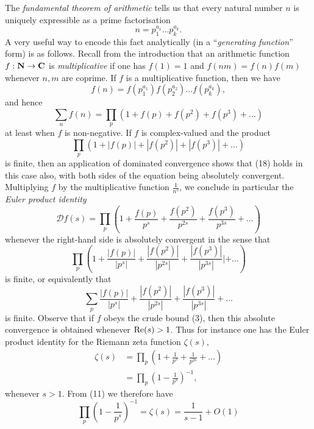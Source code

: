 \documentclass[10pt,reqno]{amsart}
\begin{document}
The \emph{fundamental theorem of arithmetic} tells us that every natural number $n$ is uniquely expressible as a prime factorisation
%
\begin{equation}   n = p_1^{a_1} \dots p_k^{a_k}. \end{equation}
%
A very useful way to encode this fact analytically (in a “\emph{generating function}” form) is as follows. Recall from the introduction that an arithmetic function $f: {\bf N} \rightarrow {\bf C}$ is \emph{multiplicative} if one has $f(1)=1$ and $f(nm) = f(n) f(m)$ whenever $n,m$ are coprime. If $f$ is a multiplicative function, then we have
%
\[  f(n) = f(p_1^{a_1}) f(p_2^{a_2}) \dots f(p_k^{a_k}),\]
%
and hence
%
\begin{equation}   \sum_n f(n) = \prod_p (1 + f(p) + f(p^2) + f(p^3) + \dots ) \end{equation}
%
at least when $f$ is non-negative. If $f$ is complex-valued and the product
%
\[  \prod_p (1 + |f(p)| + |f(p^2)| + |f(p^3)| + \dots )\]
%
is finite, then an application of dominated convergence shows that (18) holds in this case also, with both sides of the equation being absolutely convergent. Multiplying $f$ by the multiplicative function $\frac{1}{n^s}$, we conclude in particular the \emph{Euler product identity}
%
\begin{equation}   {\mathcal D} f(s) = \prod_p \left(1 + \frac{f(p)}{p^s} + \frac{f(p^2)}{p^{2s}} + \frac{f(p^3)}{p^{3s}} + \dots \right) \end{equation}
%
whenever the right-hand side is absolutely convergent in the sense that
%
\[  \prod_p \left(1 + \frac{|f(p)|}{|p^s|} + \frac{|f(p^2)|}{|p^{2s}|} + \frac{|f(p^3)|}{|p^{3s}|}|+ \dots \right)\]
%
is finite, or equivalently that
%
\[  \sum_p \frac{|f(p)|}{|p^s|} + \frac{|f(p^2)|}{|p^{2s}|} + \frac{|f(p^3)|}{|p^{3s}|} + \dots \]
%
is finite. Observe that if $f$ obeys the crude bound (3), then this absolute convergence is obtained whenever $\hbox{Re}(s) > 1$. Thus for instance one has the Euler product identity for the Riemann zeta function $\zeta(s)$,
%
\begin{equation}
\begin{split}
    \zeta(s) &= \prod_p (1 + \frac{1}{p^s} + \frac{1}{p^{2s}} + \dots )\\
    &= \prod_p \left( 1 - \frac{1}{p^s} \right)^{-1},
\end{split}
\end{equation}
%
whenever $s>1$. From (11) we therefore have
%
\begin{equation}
    \prod_p \left(1 - \frac{1}{p^s} \right)^{-1} = \zeta(s) = \frac{1}{s-1} + O(1)
\end{equation}
\end{document}
